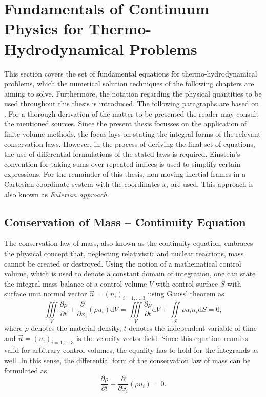 
\section{Fundamentals of Continuum Physics for Thermo-Hydrodynamical Problems}

This section covers the set of fundamental equations for thermo-hydrodynamical problems, which the numerical solution techniques of the following chapters are aiming to solve. Furthermore, the notation regarding the physical quantities to be used throughout this thesis is introduced. The following paragraphs are based on \cite{andersson84,ferziger02,kundu12,spurk10}. For a thorough derivation of the matter to be presented the reader may consult the mentioned sources. Since the present thesis focusses on the application of finite-volume methods, the focus lays on stating the integral forms of the relevant conservation laws. However, in the process of deriving the final set of equations, the use of differential formulations of the stated laws is required. Einstein's convention for taking sums over repeated indices is used to simplify certain expressions. For the remainder of this thesis, non-moving inertial frames in a Cartesian coordinate system with the coordinates \( x_i \) are used. This approach is also known as \emph{Eulerian approach}.  

\subsection{Conservation of Mass -- Continuity Equation}

The conservation law of mass, also known as the continuity equation, embraces the physical concept that, neglecting relativistic and nuclear reactions, mass cannot be created or destroyed. Using the notion of a mathematical control volume, which is used to denote a constant domain of integration, one can state the integral mass balance of a control volume \(V\) with control surface \(S\) with surface unit normal vector \(\vec{n} = \left( n_i \right)_{i=1,\dots,3}\) using Gauss' theorem as
\begin{displaymath}
  \iiint\limits_V \frac{\partial \rho}{\partial t} + \frac{\partial}{\partial x_i}\left( \rho u_i \right) \mathrm{d}V 
  =  \iiint\limits_V \frac{\partial \rho}{\partial t} \mathrm{d}V + \iint\limits_S \rho u_i n_i \mathrm{d}S
  = 0,
\end{displaymath}
where \( \rho \) denotes the material density, \(t \) denotes the independent variable of time and \(\vec{u} = \left( u_i \right)_{i=1,\dots,3}\) is the velocity vector field. Since this equation remains valid for arbitrary control volumes, the equality has to hold for the integrands as well. In this sense, the differential form of the conservation law of mass can be formulated as
\begin{equation}
  \label{eq:contifull}
  \frac{\partial \rho}{\partial t} + \frac{\partial}{\partial x_i}\left( \rho u_i \right)
  = 0.
\end{equation}

